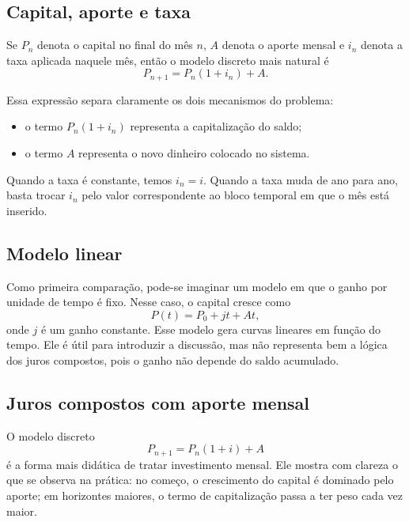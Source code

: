 \documentclass[11pt,a4paper]{article}
\begin{document}
\subsection{Capital, aporte e taxa}

Se \(P_n\) denota o capital no final do mês \(n\), \(A\) denota o aporte mensal e \(i_n\)
denota a taxa aplicada naquele mês, então o modelo discreto mais natural é
\begin{equation}
P_{n+1} = P_n (1+i_n) + A.
\end{equation}

Essa expressão separa claramente os dois mecanismos do problema:
\begin{itemize}[leftmargin=*, itemsep=0.2em]
    \item o termo \(P_n(1+i_n)\) representa a capitalização do saldo;
    \item o termo \(A\) representa o novo dinheiro colocado no sistema.
\end{itemize}

Quando a taxa é constante, temos \(i_n=i\). Quando a taxa muda de ano para ano, basta
trocar \(i_n\) pelo valor correspondente ao bloco temporal em que o mês está inserido.

\subsection{Modelo linear}

Como primeira comparação, pode-se imaginar um modelo em que o ganho por unidade de
tempo é fixo. Nesse caso, o capital cresce como
\begin{equation}
P(t)=P_0 + jt + At,
\end{equation}
onde \(j\) é um ganho constante. Esse modelo gera curvas lineares em função do tempo.
Ele é útil para introduzir a discussão, mas não representa bem a lógica dos juros
compostos, pois o ganho não depende do saldo acumulado.

\subsection{Juros compostos com aporte mensal}

O modelo discreto
\begin{equation}
P_{n+1}=P_n(1+i)+A
\end{equation}
é a forma mais didática de tratar investimento mensal. Ele mostra com clareza o que se
observa na prática: no começo, o crescimento do capital é dominado pelo aporte; em
horizontes maiores, o termo de capitalização passa a ter peso cada vez maior.
\end{document}
